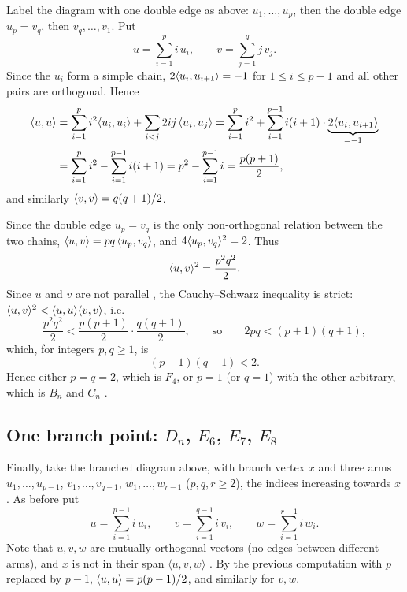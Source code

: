 Label the diagram with one double edge as above: $u_1,\dots,u_p$, then the double edge
$u_p = v_q$, then $v_q,\dots,v_1$. Put
\[
  u=\sum_{i=1}^p i\,u_i,\qquad v=\sum_{j=1}^q j\,v_j .
\]
Since the $u_i$ form a simple chain, $2\langle u_i, u_{i+1}\rangle=-1$ for $1\le i\le p-1$ and all other pairs
are orthogonal. Hence
\begin{align*}
  \langle u, u\rangle &= \sum_{i=1}^p i^2\langle u_i, u_i\rangle + \sum_{i<j} 2ij\,\langle u_i, u_j\rangle
   = \sum_{i=1}^p i^2 + \sum_{i=1}^{p-1} i(i+1)\cdot\underbrace{2\langle u_i, u_{i+1}\rangle}_{=-1}\\
  &= \sum_{i=1}^p i^2 - \sum_{i=1}^{p-1} i(i+1) = p^2 - \sum_{i=1}^{p-1} i = \frac{p(p+1)}{2},
\end{align*}
and similarly $\langle v, v\rangle = q(q+1)/2$.

Since the double edge $u_p = v_q$ is the only non-orthogonal relation between the two chains,
$\langle u, v\rangle = pq\,\langle u_p, v_q\rangle$, and $4\langle u_p, v_q\rangle^2=2$. Thus
\[
  \langle u, v\rangle^2 = \frac{p^2q^2}{2}.
\]
Since $u$ and $v$ are not parallel , the
Cauchy--Schwarz inequality is strict: $\langle u, v\rangle^2 < \langle u, u\rangle\langle v, v\rangle$, i.e.
\[
  \frac{p^2q^2}{2} < \frac{p(p+1)}{2}\cdot\frac{q(q+1)}{2},
  \qquad\text{so}\qquad 2pq < (p+1)(q+1),
\]
which, for integers $p,q\ge 1$, is
\[
  \boxed{(p-1)(q-1) < 2.}
\]
Hence either $p=q=2$, which is $F_4$, or $p=1$ (or $q=1$) with the other arbitrary, which is
$B_n$ and $C_n$ .

\subsection{One branch point: \texorpdfstring{$D_n$, $E_6$, $E_7$, $E_8$}{Dn, E6, E7, E8}}

Finally, take the branched diagram above, with branch vertex $x$ and three arms
$u_1,\dots,u_{p-1}$, $v_1,\dots,v_{q-1}$, $w_1,\dots,w_{r-1}$ ($p,q,r\ge 2$), the indices
increasing towards $x$. As before put
\[
  u=\sum_{i=1}^{p-1} i\,u_i,\qquad v=\sum_{i=1}^{q-1} i\,v_i,\qquad w=\sum_{i=1}^{r-1} i\,w_i .
\]
Note that $u,v,w$ are mutually orthogonal vectors (no edges between different arms), and
$x$ is not in their span $\langle u,v,w\rangle$ .
By the previous computation with $p$ replaced by $p-1$,
$\langle u, u\rangle = p(p-1)/2$, and similarly for $v,w$.

